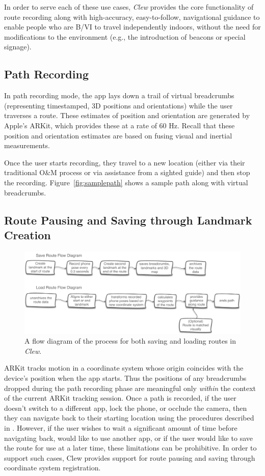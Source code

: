 \documentclass[chi_draft]{sigchi}
\newcommand{\BVI}{B/VI\xspace}
\newcommand{\OM}{O\&M\xspace}
\begin{document}
In order to serve each of these use cases, \emph{Clew} provides the core functionality of route recording along with high-accuracy, easy-to-follow, navigational guidance to enable people who are \BVI to travel independently indoors, without the need for modifications to the environment (e.g., the introduction of beacons or special signage).

\subsection{Path Recording}

In path recording mode, the app lays down a trail of virtual breadcrumbs (representing timestamped, 3D positions and orientations) while the user traverses a route.  These estimates of position and orientation are generated by Apple's ARKit, which provides these at a rate of 60 Hz.  Recall that these position and orientation estimates are based on fusing visual and inertial measurements. %

Once the user starts recording, they travel to a new location (either via their traditional \OM process or via assistance from a sighted guide) and then stop the recording.  Figure~\ref{fig:samplepath} shows a sample path along with virtual breadcrumbs.
%
\subsection{Route Pausing and Saving through Landmark Creation}
\begin{figure}
\begin{center}
\includegraphics[width=.7\linewidth]{Figures/FlowDiagram}
\end{center}
\caption{A flow diagram of the process for both saving and loading routes in \emph{Clew}.\label{fig:flow}}
\end{figure}
ARKit tracks motion in a coordinate system whose origin coincides with the device's position when the app starts.  Thus the positions of any breadcrumbs dropped during the path recording phase are meaningful only \emph{within} the context of the current ARKit tracking session.  Once a path is recorded, if the user doesn't switch to a different app, lock the phone, or occlude the camera, then they can navigate back to their starting location using the procedures described in \emph{}.  However, if the user wishes to wait a significant amount of time before navigating back, would like to use another app, or if the user would like to save the route for use at a later time, these limitations can be prohibitive.  In order to support such cases, Clew provides support for route pausing and saving through coordinate system registration.
\end{document}
